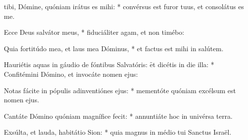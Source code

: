 \begin{psalmus}

 tibi, Dómine, quóniam irátus es mihi: * convérsus est furor tuus, et consolátus es me.

Ecce Deus salvátor meus, * fiduciáliter agam, et non timébo:

Quia fortitúdo mea, et laus mea Dóminus, * et factus est mihi in salútem.

Hauriétis aquas in gáudio de fóntibus Salvatóris: \f et dicétis in die illa: * Confitémini Dómino, et invocáte nomen ejus:

Notas fácite in pópulis adinventiónes ejus: * mementóte quóniam excélsum est nomen ejus.

Cantáte Dómino quóniam magnífice fecit: * annuntiáte hoc in univérsa terra.

Exsúlta, et lauda, habitátio Sion: * quia magnus in médio tui Sanctus Israël.
\end{psalmus}
